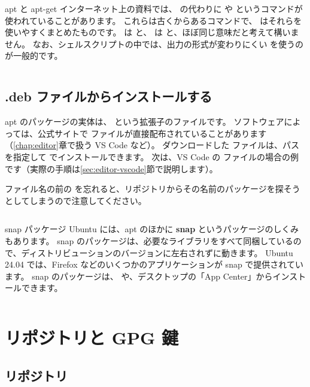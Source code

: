 \begin{column}{apt と apt-get}
  インターネット上の資料では、 の代わりに  や  というコマンドが使われていることがあります。
  これらは古くからあるコマンドで、 はそれらを使いやすくまとめたものです。
   は  と、 は  と、ほぼ同じ意味だと考えて構いません。
  なお、シェルスクリプトの中では、出力の形式が変わりにくい  を使うのが一般的です。
\end{column}

\subsection{.deb ファイルからインストールする}

apt のパッケージの実体は、 という拡張子のファイルです。
ソフトウェアによっては、公式サイトで  ファイルが直接配布されていることがあります（\ref{chap:editor}章で扱う VS Code など）。
ダウンロードした  ファイルは、パスを指定して  でインストールできます。
次は、VS Code の  ファイルの場合の例です（実際の手順は\ref{sec:editor-vscode}節で説明します）。


ファイル名の前の  を忘れると、リポジトリからその名前のパッケージを探そうとしてしまうので注意してください。

\begin{column}{snap パッケージ}
  Ubuntu には、apt のほかに \textbf{snap} というパッケージのしくみもあります。
  snap のパッケージは、必要なライブラリをすべて同梱しているので、ディストリビューションのバージョンに左右されずに動きます。
  Ubuntu 24.04 では、Firefox などのいくつかのアプリケーションが snap で提供されています。
  snap のパッケージは、 や、デスクトップの「App Center」からインストールできます。
\end{column}

\section{リポジトリと GPG 鍵}
\label{sec:package-repository}

\subsection{リポジトリ}

